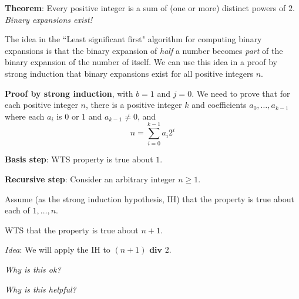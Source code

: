 \documentclass[12pt, oneside]{article}
\begin{document}
{\bf Theorem}: Every positive integer is a sum of (one or more) distinct powers of $2$.
{\it Binary expansions exist!}




The idea in the ``Least significant first" algorithm 
for computing binary expansions is that the binary
expansion of {\it half} a number becomes {\it part} of the binary expansion of 
the number of itself. We can use this 
idea in a proof by strong induction that binary expansions exist for all 
positive integers $n$.


{\bf Proof by strong induction}, with $b=1$ and $j=0$. We need to prove
that for each positive integer $n$, there is 
a positive integer $k$ and coefficients $a_0, \ldots, a_{k-1}$ 
where each $a_i$ is $0$ or $1$ and $a_{k-1} \neq 0$, and 
\[
n = \sum_{i=0}^{k-1} a_i 2^i
\]



{\bf Basis step}:  WTS property is true about  $1$.

\phantom{Choose $a_0 = 1$, then $(a_0)_2 = 1 \cdot 2^0 = 1$.}
\vspace{80pt}


{\bf Recursive step}: Consider an arbitrary integer $n \geq 1$.

Assume (as the strong induction hypothesis, IH) that the property is true about  each of $1, \ldots, n$.  

WTS that the property is true about $n+1$.

{\it Idea}: We will apply the IH to $(n+1) \textbf{ div } 2$.

{\it Why is this ok?}


\vfill
\newpage
{\it Why is this helpful?}
\end{document}
